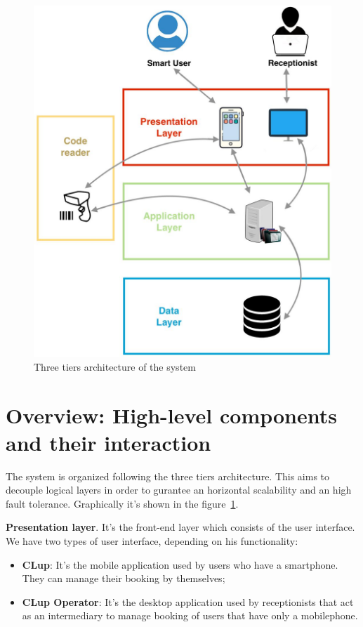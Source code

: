 \begin{figure}[H]
  \caption{Three tiers architecture of the system}
  \label{3tiers}
  \centering
  \includegraphics[scale=0.25]{diagrams/3_tiers.jpeg}

\end{figure}


\section{Overview: High-level components and their interaction}
The system is organized following the three tiers architecture. This aims to decouple logical layers in order to gurantee an horizontal scalability and an high fault tolerance.
Graphically it's shown in the figure~\ref{3tiers}.
\par

\textbf{Presentation layer}. It's the front-end layer which consists of the user interface. We have two types of user interface, depending on his functionality: 
\begin{itemize}
\item \textbf{CLup}: It's the mobile application used by users who have a smartphone. They can manage their booking by themselves;
\item \textbf{CLup Operator}: It's the desktop application used by receptionists that act as an intermediary to manage booking of users that have only a mobilephone.
\end{itemize}

